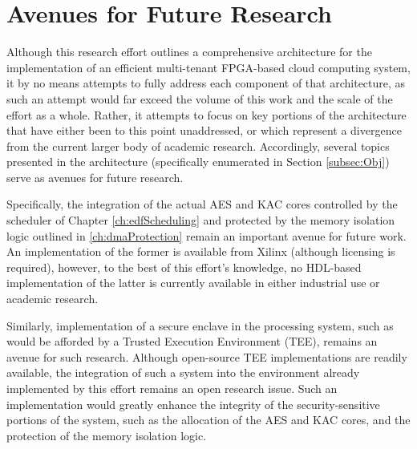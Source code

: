 \section{Avenues for Future Research}
Although this research effort outlines a comprehensive architecture for the implementation of an efficient multi-tenant FPGA-based cloud computing system, it by no means attempts to fully address each component of that architecture, as such an attempt would far exceed the volume of this work and the scale of the effort as a whole. Rather, it attempts to focus on key portions of the architecture that have either been to this point unaddressed, or which represent a divergence from the current larger body of academic research. Accordingly, several topics presented in the architecture (specifically enumerated in Section \ref{subsec:Obj}) serve as avenues for future research. 

Specifically, the integration of the actual AES and KAC cores controlled by the scheduler of Chapter \ref{ch:edfScheduling} and protected by the memory isolation logic outlined in \ref{ch:dmaProtection} remain an important avenue for future work. An implementation of the former is available from Xilinx (although licensing is required), however, to the best of this effort's knowledge, no HDL-based implementation of the latter is currently available in either industrial use or academic research.

Similarly, implementation of a secure enclave in the processing system, such as would be afforded by a Trusted Execution Environment (TEE), remains an avenue for such research. Although open-source TEE implementations are readily available, the integration of such a system into the environment already implemented by this effort remains an open research issue. Such an implementation would greatly enhance the integrity of the security-sensitive portions of the system, such as the allocation of the AES and KAC cores, and the protection of the memory isolation logic.

